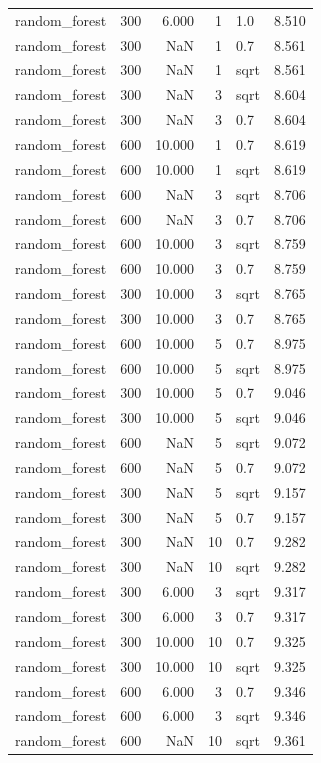 \begin{tabular}{lrrrlr}
random_forest & 300 & 6.000 & 1 & 1.0 & 8.510 \\
random_forest & 300 & NaN & 1 & 0.7 & 8.561 \\
random_forest & 300 & NaN & 1 & sqrt & 8.561 \\
random_forest & 300 & NaN & 3 & sqrt & 8.604 \\
random_forest & 300 & NaN & 3 & 0.7 & 8.604 \\
random_forest & 600 & 10.000 & 1 & 0.7 & 8.619 \\
random_forest & 600 & 10.000 & 1 & sqrt & 8.619 \\
random_forest & 600 & NaN & 3 & sqrt & 8.706 \\
random_forest & 600 & NaN & 3 & 0.7 & 8.706 \\
random_forest & 600 & 10.000 & 3 & sqrt & 8.759 \\
random_forest & 600 & 10.000 & 3 & 0.7 & 8.759 \\
random_forest & 300 & 10.000 & 3 & sqrt & 8.765 \\
random_forest & 300 & 10.000 & 3 & 0.7 & 8.765 \\
random_forest & 600 & 10.000 & 5 & 0.7 & 8.975 \\
random_forest & 600 & 10.000 & 5 & sqrt & 8.975 \\
random_forest & 300 & 10.000 & 5 & 0.7 & 9.046 \\
random_forest & 300 & 10.000 & 5 & sqrt & 9.046 \\
random_forest & 600 & NaN & 5 & sqrt & 9.072 \\
random_forest & 600 & NaN & 5 & 0.7 & 9.072 \\
random_forest & 300 & NaN & 5 & sqrt & 9.157 \\
random_forest & 300 & NaN & 5 & 0.7 & 9.157 \\
random_forest & 300 & NaN & 10 & 0.7 & 9.282 \\
random_forest & 300 & NaN & 10 & sqrt & 9.282 \\
random_forest & 300 & 6.000 & 3 & sqrt & 9.317 \\
random_forest & 300 & 6.000 & 3 & 0.7 & 9.317 \\
random_forest & 300 & 10.000 & 10 & 0.7 & 9.325 \\
random_forest & 300 & 10.000 & 10 & sqrt & 9.325 \\
random_forest & 600 & 6.000 & 3 & 0.7 & 9.346 \\
random_forest & 600 & 6.000 & 3 & sqrt & 9.346 \\
random_forest & 600 & NaN & 10 & sqrt & 9.361 \\

\end{tabular}
